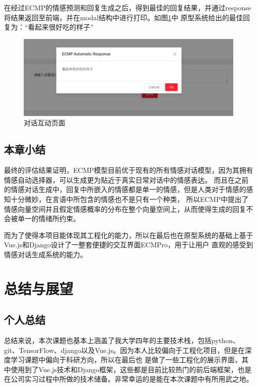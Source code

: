 \documentclass[supercite]{HustGraduPaper}
\theoremstyle{definition}
\begin{document}
在经过ECMP的情感预测和回复生成之后，得到最佳的回复结果，并通过response将结果返回至前端，并在modal结构中进行打印。如图\ref{Fig.chatresponse}中
原型系统给出的最佳回复为：“看起来很好吃的样子”
\begin{figure}[H] %
  \centering %
  \includegraphics[width=1\textwidth]{images/chatresponse.jpg} %
  \caption{对话互动页面} %
  \label{Fig.chatresponse} %
\end{figure}

\subsection{本章小结}
最终的评估结果证明，ECMP模型目前优于现有的所有情感对话模型，因为其拥有情感自动选择器，可以生成更为贴近于真实日常对话中的情感表达。
而且在之前的情感对话生成中，回复中所嵌入的情感都是单一的情感，但是人类对于情感的感知十分微妙，在言语中所包含的情感也不是只有一个种类，
所以ECMP中提出了情感向量空间并且假定情感概率的分布在整个向量空间上，从而使得生成的回复不会被单一的情绪所约束。

而为了使得本项目能体现其工程化的能力，所以在最后也在原型系统的基础上基于Vue.js和Django设计了一整套便捷的交互界面ECMPro，用于让用户
直观的感受到情感对话生成系统的能力。


\section{总结与展望}
\subsection{个人总结}
总结来说，本次课题也基本上涵盖了我大学四年的主要技术栈，包括python、git、TensorFlow、django以及Vue.js。因为本人比较偏向于工程化项目，但是在深度学习课题中偏向于科研方向，所以在最后也
是做了一些工程化的展示界面，其中使用到了Vue.js技术和Django框架，这些都是目前比较热门的前后端框架，也是在公司实习过程中所做的技术储备。非常幸运的是能在本次课题中有所用武之地。
\end{document}
